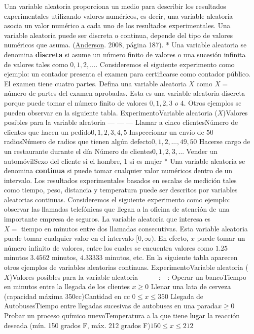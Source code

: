\documentclass[
]{book}
\begin{document}
Una variable aleatoria proporciona un medio para describir los resultados experimentales utilizando valores numéricos, es decir, una variable aleatoria asocia un valor numérico a cada uno de los resultados experimentales. Una variable aleatoria puede ser discreta o continua, depende del tipo de valores numéricos que asuma. (\protect\hyperlink{ux5cux2520Referencias}{Anderson}. 2008, página 187).
* Una variable aleatoria se denomina \textbf{discreta} si asume un número finito de valores o una sucesión infinita de valores tales como \(0,1,2,\ldots\). Consideremos el siguiente experimento como ejemplo: un contador presenta el examen para certificarse como contador público. El examen tiene cuatro partes. Defina una variable aleatoria \(X\) como \(X =\) número de partes del examen aprobadas. Esta es una variable aleatoria discreta porque puede tomar el número finito de valores \(0,1,2,3\,\,o \,\, 4\).
Otros ejemplos se pueden observar en la siguiente tabla.
\textbar Experimento\textbar Variable aleatoria (\(X\))\textbar Valores posibles para la variable aleatoria\textbar{}
\textbar--- \textbar--- \textbar--- \textbar{}
\textbar Llamar a cinco clientes\textbar Número de clientes que hacen un pedido\textbar{}\(0,1,2,3,4,5\)\textbar{}
\textbar Inspeccionar un envío de 50 radios\textbar Número de radios que tienen algún defecto\textbar{}\(0,1,2,…,49,50\)\textbar{}
\textbar Hacerse cargo de un restaurante durante el día\textbar{} Número de clientes\textbar{}\(0,1,2,3,…\)\textbar{}
\textbar Vender un automóvil\textbar Sexo del cliente si el hombre, 1 si es mujer\textbar{}
* Una variable aleatoria se denomina \textbf{continua} si puede tomar cualquier valor numéricos dentro de un intervalo. Los resultados experimentales basados en escalas de medición tales como tiempo, peso, distancia y temperatura puede ser descritos por variables aleatorias continuas. Consideremos el siguiente experimento como ejemplo: observar las llamadas telefónicas que llegan a la oficina de atención de una importante empresa de seguros. La variable aleatoria que interesa es\\
\(X=\) tiempo en minutos entre dos llamadas consecutivas. Esta variable aleatoria puede tomar cualquier valor en el intervalo \([0,\infty)\). En efecto, \(x\) puede tomar un número infinito de valores, entre los cuales se encuentra valores como \(1.25\) minutos \(3.4562\) minutos, \(4.33333\) minutos, etc.
En la siguiente tabla aparecen otros ejemplos de variables aleatorias continuas.
\textbar Experimento\textbar Variable aleatoria (\(X\))\textbar Valores posibles para la variable aleatoria\textbar{}
\textbar--- \textbar--- \textbar:---:\textbar{}
\textbar Operar un banco\textbar Tiempo en minutos entre la llegada de los clientes\textbar{} \(x\geq 0\)\textbar{}
\textbar Llenar una lata de cerveza (capacidad máxima 350cc)\textbar Cantidad en cc \textbar{}\(0\leq x \leq 350\)\textbar{}
\textbar Llegada de Autobuses\textbar Tiempo entre llegadas sucesivas de autobuses en una parada\textbar{}\(x\geq 0\)\textbar{}
\textbar Probar un proceso químico nuevo\textbar Temperatura a la que tiene lugar la reacción deseada (mín. 150 grados F, máx. 212 grados F)\textbar{}\(150\leq x \leq 212\)
\end{document}
